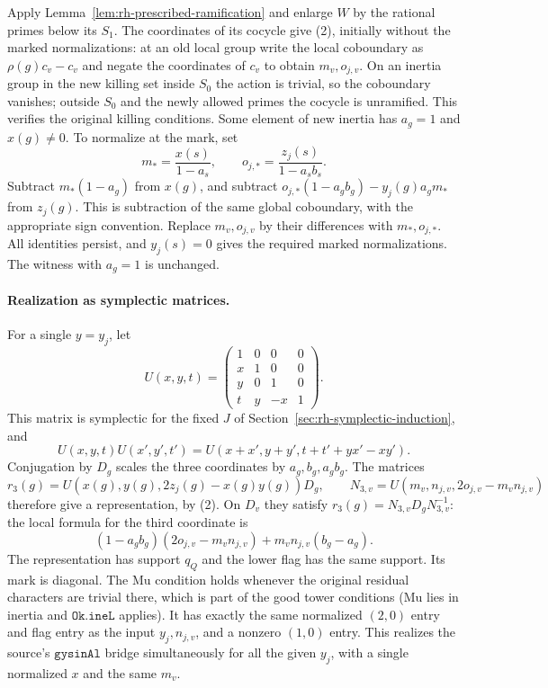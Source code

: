 Apply Lemma~\ref{lem:rh-prescribed-ramification} and enlarge
\(W\) by the rational primes below its \(S_1\). The coordinates
of its cocycle give (2), initially without the marked
normalizations: at an old local group write the local
coboundary as \(\rho(g)c_v-c_v\) and negate the coordinates
of \(c_v\) to obtain \(m_v,o_{j,v}\). On an inertia group
in the new killing set inside \(S_0\) the action is trivial,
so the coboundary vanishes; outside \(S_0\) and the newly
allowed primes the cocycle is unramified. This verifies the
original killing conditions. Some element of new inertia
has \(a_g=1\) and \(x(g)\ne0\).
To normalize at the mark, set
\[
 m_*=\frac{x(s)}{1-a_s},\qquad
 o_{j,*}=\frac{z_j(s)}{1-a_sb_s}.
\]
Subtract \(m_*(1-a_g)\) from \(x(g)\), and subtract
\(o_{j,*}(1-a_gb_g)-y_j(g)a_gm_*\) from \(z_j(g)\).
This is subtraction of the same global coboundary, with
the appropriate sign convention. Replace \(m_v,o_{j,v}\)
by their differences with \(m_*,o_{j,*}\). All identities
persist, and \(y_j(s)=0\) gives the required marked
normalizations. The witness with \(a_g=1\) is unchanged.

\paragraph{Realization as symplectic matrices.}
For a single \(y=y_j\), let
\[
 U(x,y,t)=
 \begin{pmatrix}1&0&0&0\\x&1&0&0\\y&0&1&0\\
                 t&y&-x&1\end{pmatrix}.
\]
This matrix is symplectic for the fixed \(J\) of
Section~\ref{sec:rh-symplectic-induction}, and
\[
 U(x,y,t)U(x',y',t')=
 U(x+x',y+y',t+t'+yx'-xy').
\]
Conjugation by \(D_g\) scales the three coordinates by
\(a_g,b_g,a_gb_g\). The matrices
\[
 r_3(g)=U(x(g),y(g),2z_j(g)-x(g)y(g))D_g,\qquad
 N_{3,v}=U(m_v,n_{j,v},2o_{j,v}-m_vn_{j,v})
\]
therefore give a representation, by (2). On \(D_v\)
they satisfy \(r_3(g)=N_{3,v}D_gN_{3,v}^{-1}\):
the local formula for the third coordinate is
\[
 (1-a_gb_g)(2o_{j,v}-m_vn_{j,v})
       +m_vn_{j,v}(b_g-a_g).
\]
The representation has support \(q_Q\) and the lower
flag has the same support. Its mark is diagonal. The
\(\mathrm{Mu}\) condition holds whenever the original
residual characters are trivial there, which is part of
the good tower conditions (\(\mathrm{Mu}\) lies in inertia
and \(\texttt{Ok.ineL}\) applies). It has exactly the
same normalized \((2,0)\) entry and flag entry as the
input \(y_j,n_{j,v}\), and a nonzero \((1,0)\) entry.
This realizes the source's \(\texttt{gysinAl}\) bridge
simultaneously for all the given \(y_j\), with a single
normalized \(x\) and the same \(m_v\).


